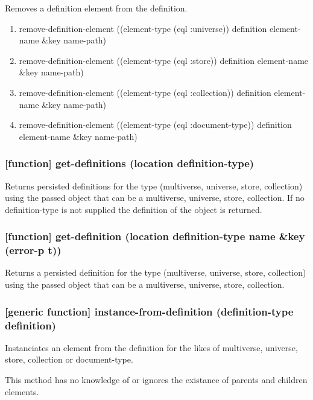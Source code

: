 \documentclass[11pt]{article}
\begin{document}
Removes a definition element from the definition.

\begin{enumerate}
\item remove-definition-element ((element-type (eql :universe)) definition element-name \&key name-path)
\label{sec:org067ca9a}
\item remove-definition-element ((element-type (eql :store)) definition element-name \&key name-path)
\label{sec:org23367a9}
\item remove-definition-element ((element-type (eql :collection)) definition element-name \&key name-path)
\label{sec:orgd30d659}
\item remove-definition-element ((element-type (eql :document-type)) definition element-name \&key name-path)
\label{sec:orgcd39fec}
\end{enumerate}

\subsubsection{[function] get-definitions (location definition-type)}
\label{sec:orga56e2d2}

Returns persisted definitions for the type (multiverse, universe,
store, collection) using the passed object that can be a multiverse,
universe, store, collection.  If no definition-type is not supplied
the definition of the object is returned.

\subsubsection{[function] get-definition (location definition-type name \&key (error-p t))}
\label{sec:orgc8e9742}

Returns a persisted definition for the type (multiverse, universe,
store, collection) using the passed object that can be a multiverse,
universe, store, collection.

\subsubsection{[generic function] instance-from-definition (definition-type definition)}
\label{sec:orgb24e4f0}

Instanciates an element from the definition for the likes of
multiverse, universe, store, collection or document-type.

This method has no knowledge of or ignores the existance of parents
and children elements.
\end{document}
